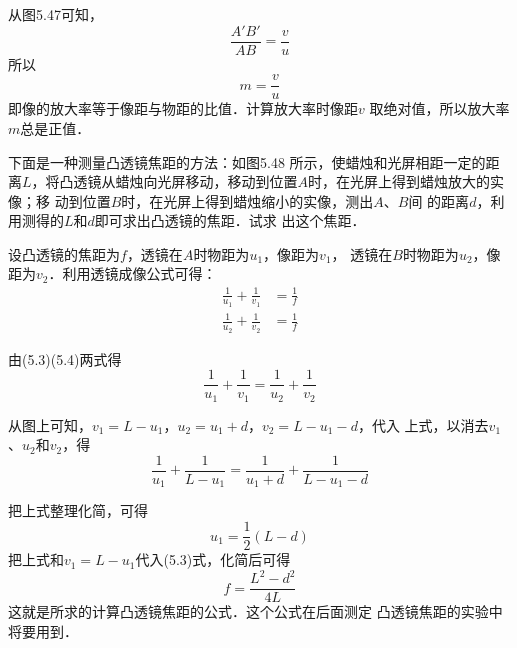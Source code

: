 从图5.47可知，
\[\frac{A'B'}{AB}=\frac{v}{u} \]
所以
\[m=\frac{v}{u}\]
即像的放大率等于像距与物距的比值．计算放大率时像距$v$
取绝对值，所以放大率$m$总是正值．

\begin{example}
    下面是一种测量凸透镜焦距的方法：如图5.48
所示，使蜡烛和光屏相距一定的距离$L$，将凸透镜从蜡烛向光屏移动，移动到位置$A$时，在光屏上得到蜡烛放大的实像；移
动到位置$B$时，在光屏上得到蜡烛缩小的实像，测出$A$、$B$间
的距离$d$，利用测得的$L$和$d$即可求出凸透镜的焦距．试求
出这个焦距．
\end{example}

\begin{figure}[htp]
	\centering
{}
	\caption{}
\end{figure}

\begin{solution}
    设凸透镜的焦距为$f$，透镜在$A$时物距为$u_1$，像距为$v_1$，
    透镜在$B$时物距为$u_2$，像距为$v_2$．利用透镜成像公式可得：
   \begin{align}
\frac{1}{u_1}+\frac{1}{v_1}&=\frac{1}{f}\\
\frac{1}{u_2}+\frac{1}{v_2}&=\frac{1}{f}
   \end{align}
 
    由(5.3)(5.4)两式得
\[\frac{1}{u_1}+\frac{1}{v_1}=\frac{1}{u_2}+\frac{1}{v_2} \]
    
从图上可知，$v_1=L-u_1$，$u_2=u_1+d$，$v_2=L-u_1-d$，代入
    上式，以消去$v_1$、$u_2$和$v_2$，得
    \[\frac{1}{u_1}+\frac{1}{L-u_1}=\frac{1}{u_1+d}+\frac{1}{L-u_1-d} \]

    把上式整理化简，可得
\[u_1=\frac{1}{2}(L-d) \]
    把上式和$v_1=L-u_1$代入(5.3)式，化简后可得
\[f=\frac{L^2-d^2}{4L} \]
    这就是所求的计算凸透镜焦距的公式．这个公式在后面测定
    凸透镜焦距的实验中将要用到．
\end{solution}

